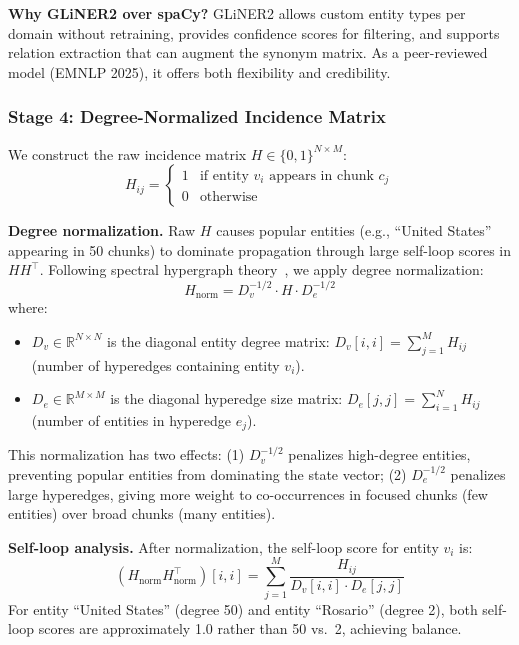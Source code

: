 \documentclass[11pt,a4paper]{article}
\begin{document}
\textbf{Why GLiNER2 over spaCy?} GLiNER2 allows custom entity types per domain without retraining, provides confidence scores for filtering, and supports relation extraction that can augment the synonym matrix. As a peer-reviewed model (EMNLP 2025), it offers both flexibility and credibility.

\subsubsection{Stage 4: Degree-Normalized Incidence Matrix}

We construct the raw incidence matrix $H \in \{0,1\}^{N \times M}$:
\begin{equation}
    H_{ij} = \begin{cases} 1 & \text{if entity } v_i \text{ appears in chunk } c_j \\ 0 & \text{otherwise} \end{cases}
\end{equation}

\textbf{Degree normalization.} Raw $H$ causes popular entities (e.g., ``United States'' appearing in 50 chunks) to dominate propagation through large self-loop scores in $HH^\top$. Following spectral hypergraph theory~\cite{zhou2006hypergraph}, we apply degree normalization:
\begin{equation}
    H_{\text{norm}} = D_v^{-1/2} \cdot H \cdot D_e^{-1/2}
\end{equation}
where:
\begin{itemize}[leftmargin=*]
    \item $D_v \in \mathbb{R}^{N \times N}$ is the diagonal entity degree matrix: $D_v[i,i] = \sum_{j=1}^{M} H_{ij}$ (number of hyperedges containing entity $v_i$).
    \item $D_e \in \mathbb{R}^{M \times M}$ is the diagonal hyperedge size matrix: $D_e[j,j] = \sum_{i=1}^{N} H_{ij}$ (number of entities in hyperedge $e_j$).
\end{itemize}

This normalization has two effects: (1) $D_v^{-1/2}$ penalizes high-degree entities, preventing popular entities from dominating the state vector; (2) $D_e^{-1/2}$ penalizes large hyperedges, giving more weight to co-occurrences in focused chunks (few entities) over broad chunks (many entities).

\textbf{Self-loop analysis.} After normalization, the self-loop score for entity $v_i$ is:
\begin{equation}
    (H_{\text{norm}} H_{\text{norm}}^\top)[i,i] = \sum_{j=1}^{M} \frac{H_{ij}}{D_v[i,i] \cdot D_e[j,j]}
\end{equation}
For entity ``United States'' (degree 50) and entity ``Rosario'' (degree 2), both self-loop scores are approximately 1.0 rather than 50 vs.\ 2, achieving balance.
\end{document}
